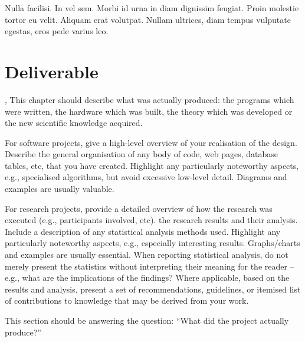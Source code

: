 \begin{savequote}[75mm]
Nulla facilisi. In vel sem. Morbi id urna in diam dignissim feugiat. Proin molestie tortor eu velit. Aliquam erat volutpat. Nullam ultrices, diam tempus vulputate egestas, eros pede varius leo.
\end{savequote}

\chapter{Deliverable}

, This chapter should describe what was actually produced: the programs which
were written, the hardware which was built, the theory which was developed or
the new scientific knowledge acquired.

For software projects, give a high-level overview of your realisation of the
design. Describe the general organisation of any body of code, web pages,
database tables, etc, that you have created. Highlight any particularly
noteworthy aspects, e.g., specialised algorithms, but avoid excessive low-level
detail. Diagrams and examples are usually valuable.

For research projects, provide a detailed overview of how the research was
executed (e.g., participants involved, etc). the research results and their
analysis. Include a description of any statistical analysis methods used.
Highlight any particularly noteworthy aspects, e.g., especially interesting
results. Graphs/charts and examples are usually essential. When reporting
statistical analysis, do not merely present the statistics without interpreting
their meaning for the reader – e.g., what are the implications of the findings?
Where applicable, based on the results and analysis, present a set of
recommendations, guidelines, or itemised list of contributions to knowledge
that may be derived from your work.

This section should be answering the question: “What did the project actually
produce?”
